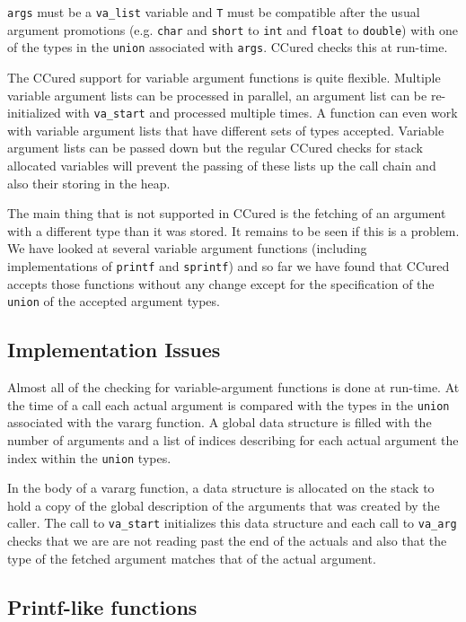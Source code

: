 \documentclass{book}
\def\t#1{{\tt #1}}
\begin{document}
 \t{args} must be a \t{va\_list} variable and \t{T} must be compatible after
the usual argument promotions (e.g. \t{char} and \t{short} to \t{int} and
\t{float} to \t{double}) with one of the types in the \t{union} associated
with \t{args}. CCured checks this at run-time. 

 The CCured support for variable argument functions is quite flexible.
Multiple variable argument lists can be processed in parallel, an argument
list can be re-initialized with \t{va\_start} and processed multiple times. A
function can even work with variable argument lists that have different sets
of types accepted. Variable argument lists can be passed down but the regular
CCured checks for stack allocated variables will prevent the passing of these
lists up the call chain and also their storing in the heap.

 The main thing that is not supported in CCured is the fetching of an argument
with a different type than it was stored. It remains to be seen if this is a
problem. We have looked at several variable argument functions (including
implementations of \t{printf} and \t{sprintf}) and so far we have found that
CCured accepts those functions without any change except for the specification
of the \t{union} of the accepted argument types. 

           \subsection{Implementation Issues}

 Almost all of the checking for variable-argument functions is done at
run-time. At the time of a call each actual argument is compared with the
types in the \t{union} associated with the vararg function. A global data
structure is filled with the number of arguments and a list of indices
describing for each actual argument the index within the \t{union} types. 

 In the body of a vararg function, a data structure is allocated on the stack
to hold a copy of the global description of the arguments that was created by
the caller. The call to \t{va\_start} initializes this data structure and each
call to \t{va\_arg} checks that we are are not reading past the end of the
actuals and also that the type of the fetched argument matches that of the
actual argument. 

         \subsection{Printf-like functions}
\end{document}
